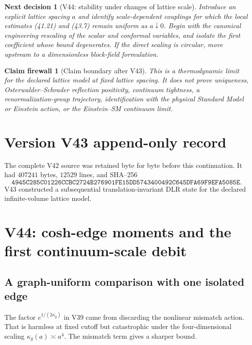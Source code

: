 \documentclass[11pt]{article}
\newtheorem{firewall}[theorem]{Claim firewall}
\newtheorem{decision}[theorem]{Next decision}
\theoremstyle{remark}
\begin{document}
\begin{decision}[V44: stability under changes of lattice scale]
\label{dec:v17v43-next}
Introduce an explicit lattice spacing \(a\) and identify scale-dependent
couplings for which the local estimates (41.21) and (43.7) remain
uniform as \(a\downarrow0\).  Begin with the canonical engineering
rescaling of the scalar and conformal variables, and isolate the first
coefficient whose bound degenerates.  If the direct scaling is
circular, move upstream to a dimensionless block-field formulation.
\end{decision}

\begin{firewall}[Claim boundary after V43]
\label{fire:v17v43}
This is a thermodynamic limit for the declared lattice model at fixed
lattice spacing.  It does not prove uniqueness, Osterwalder--Schrader
reflection positivity, continuum tightness, a renormalization-group
trajectory, identification with the physical Standard Model or
Einstein action, or the Einstein--SM continuum limit.
\end{firewall}

\section*{Version V43 append-only record}
The complete V42 source was retained byte for byte before this
continuation.  It had \(407241\) bytes, \(12529\) lines, and SHA--256
\[
 \texttt{4945C285C01226CCBC2724B276901FE15DD5743400492C645DFA69F9EFA5085E}.
\]
V43 constructed a subsequential translation-invariant DLR state for
the declared infinite-volume lattice model.


\section{V44: cosh-edge moments and the first continuum-scale debit}
\label{sec:v17v44}

\subsection{A graph-uniform comparison with one isolated edge}

The factor \(e^{1/(2\kappa_g)}\) in V39 came from discarding the
nonlinear mismatch action.  That is harmless at fixed cutoff but
catastrophic under the four-dimensional scaling
\(\kappa_g(a)\asymp a^4\).  The mismatch term gives a sharper bound.
\end{document}
